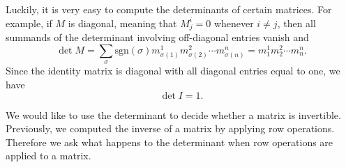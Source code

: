 Luckily, it is very easy to compute the determinants of certain matrices.  For example, if $M$ is diagonal, meaning that $M^i_j=0$ whenever $i\neq j$,  then all summands of the determinant involving off-diagonal entries vanish and 
\[
\det M = \sum_{\sigma} \text{sgn}(\sigma) m^1_{\sigma(1)}m^2_{\sigma(2)}\cdots m^n_{\sigma(n)}= m^1_{1}m^2_{2}\cdots m^n_{n}.
\]
Since the identity matrix is diagonal with all diagonal entries equal to one, we have
\[
\det I=1.
\]

We would like to use the determinant to decide whether a matrix is invertible.  Previously, we computed the inverse of a matrix by applying row operations.  Therefore we ask what happens to the determinant when row operations are applied to a matrix.

